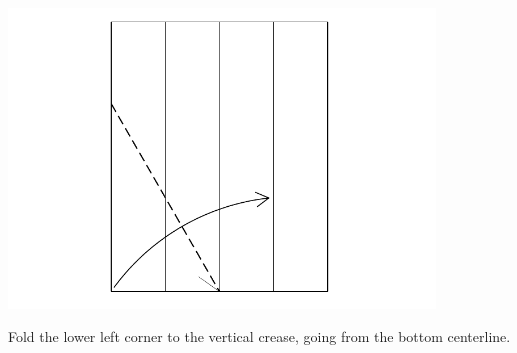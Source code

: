 \documentclass[11pt]{article}
\begin{document}
\begin{minipage}[t]{0.3\textwidth}
  \includegraphics[width=0.85\textwidth]{../figs/fig03-06}
  \begin{itemize}{\item[6.] Fold the lower left corner to the  vertical crease, going from the bottom centerline.}\end{itemize}
\end{minipage}

\vspace*{0.5in}
\end{document}
